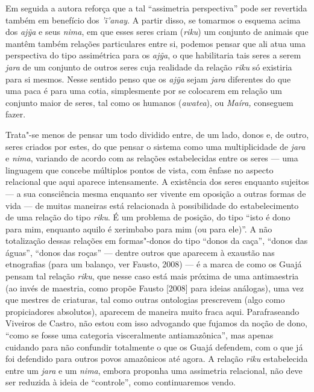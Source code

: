 Em seguida a autora reforça que a tal ``assimetria perspectiva'' pode ser
revertida também em benefício dos \emph{'ï'anay}. A partir disso, se
tomarmos o esquema acima dos \emph{ajỹa} e seus \emph{nima}, em que
esses seres criam (\emph{riku}) um conjunto de animais que mantêm também
relações particulares entre si, podemos pensar que ali atua uma
perspectiva do tipo assimétrica para os \emph{ajỹa}, o que habilitaria
tais seres a serem \emph{jara} de um conjunto de outros seres cuja
realidade da relação \emph{riku} só existiria para si mesmos. Nesse
sentido penso que os \emph{ajỹa} sejam \emph{jara} diferentes do que uma
paca é para uma cotia, simplesmente por se colocarem em relação um
conjunto maior de seres, tal como os humanos (\emph{awatea}), ou
\emph{Maíra,} conseguem fazer.

Trata"-se menos de pensar um todo dividido entre, de um lado, donos e, de
outro, seres criados por estes, do que pensar o sistema como uma
multiplicidade de \emph{jara} e \emph{nima}, variando de acordo com as
relações estabelecidas entre os seres --- uma linguagem que concebe
múltiplos pontos de vista, com ênfase no aspecto relacional que aqui
aparece intensamente. A existência dos seres enquanto sujeitos --- a sua
consciência mesma enquanto ser vivente em oposição a outras formas de
vida --- de muitas maneiras está relacionada à possibilidade do
estabelecimento de uma relação do tipo \emph{riku}. É um problema de
posição, do tipo ``isto é dono para mim, enquanto aquilo é xerimbabo
para mim (ou para ele)''. A não totalização dessas relações em
formas"-donos do tipo ``donos da caça'', ``donos das águas'', ``donos das
roças'' --- dentre outros que aparecem à exaustão nas etnografias (para um
balanço, ver Fausto, 2008) --- é a marca de como os Guajá pensam tal
relação \emph{riku}, que nesse caso está mais próxima de uma
antimaestria (ao invés de maestria, como propõe Fausto {[}2008{]} para
ideias análogas), uma vez que mestres de criaturas, tal como outras
ontologias prescrevem (algo como propiciadores absolutos), aparecem de
maneira muito fraca aqui. Parafraseando Viveiros de Castro, não estou
com isso advogando que fujamos da noção de dono, ``como se fosse uma
categoria visceralmente antiamazônica'', mas apenas cuidando para não
confundir totalmente o que os Guajá defendem, com o que já foi defendido
para outros povos amazônicos até agora. A relação \emph{riku}
estabelecida entre um \emph{jara} e um \emph{nima}, embora proponha uma
assimetria relacional, não deve ser reduzida à ideia de ``controle'', como
continuaremos vendo.


